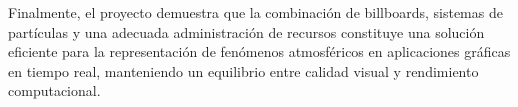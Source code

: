 Finalmente, el proyecto demuestra que la combinación de billboards, sistemas de partículas y una adecuada administración de recursos constituye una solución eficiente para la representación de fenómenos atmosféricos en aplicaciones gráficas en tiempo real, manteniendo un equilibrio entre calidad visual y rendimiento computacional.